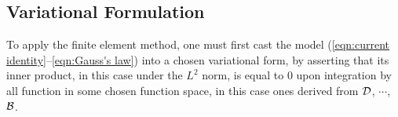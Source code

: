 \subsection{Variational Formulation}
    
    To apply the finite element method, one must first cast the model (\ref{eqn:current identity}–\ref{eqn:Gauss's law}) into a chosen variational form, by asserting that its inner product, in this case under the $L^{2}$ norm, is equal to $0$ upon integration by all function in some chosen function space, in this case ones derived from $\mathcal{D}$, $\cdots$, $\mathcal{B}$.



    
    
    
    